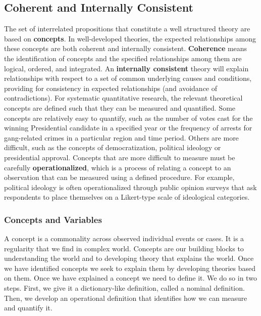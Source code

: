 \documentclass[11pt,openany]{book}\usepackage[]{graphicx}\usepackage[]{color}
\begin{document}
\begin{grbox}
\end{grbox}

\subsection{Coherent and Internally Consistent}

The set of interrelated propositions that constitute a well structured theory are based on \textbf{concepts}. In well-developed theories, the expected relationships among these concepts are both coherent and internally consistent. \textbf{Coherence} means the identification of concepts and the specified relationships among them are logical, ordered, and integrated. An \textbf{internally consistent} theory will explain relationships with respect to a set of common underlying causes and conditions, providing for consistency in expected relationships (and avoidance of contradictions). For systematic quantitative research, the relevant theoretical concepts are defined such that they can be measured and quantified. Some concepts are relatively easy to quantify, such as the number of votes cast for the winning Presidential candidate in a specified year or the frequency of arrests for gang-related crimes in a particular region and time period. Others are more difficult, such as the concepts of democratization, political ideology or presidential approval. Concepts that are more difficult to measure must be carefully \textbf{operationalized}, which is a process of relating a concept to an observation that can be measured using a defined procedure. For example, political ideology is often operationalized through public opinion surveys that ask respondents to place themselves on a Likert-type scale of ideological categories. 

\subsubsection{Concepts and Variables}
A concept is a commonality across observed individual events or cases. It is a regularity that we find in complex world. Concepts are our  building blocks to understanding the world and to developing theory that explains the world. Once we have identified concepts  we seek to explain them by developing theories based on them. Once we have explained a concept we need to define it. We do so in two steps. First, we give it a dictionary-like definition, called a nominal definition. Then, we develop an operational definition that identifies how we can measure and quantify it. 
\end{document}
